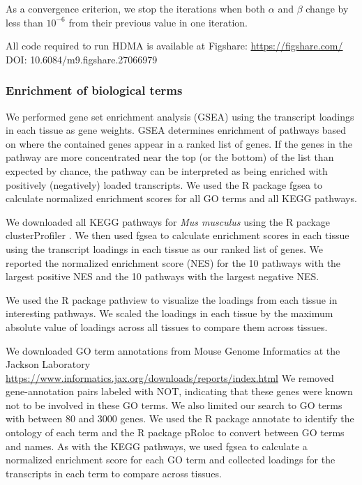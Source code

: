 \documentclass[
]{article}
\begin{document}
As a convergence criterion, we stop the iterations when both \(\alpha\)
and \(\beta\) change by less than \(10^{-6}\) from their previous value
in one iteration.

All code required to run HDMA is available at Figshare:
\url{https://figshare.com/} DOI: 10.6084/m9.figshare.27066979
\cite{DO_data}

\subsubsection{Enrichment of biological
terms}\label{enrichment-of-biological-terms}

We performed gene set enrichment analysis (GSEA) \cite{pmid16199517}
using the transcript loadings in each tissue as gene weights. GSEA
determines enrichment of pathways based on where the contained genes
appear in a ranked list of genes. If the genes in the pathway are more
concentrated near the top (or the bottom) of the list than expected by
chance, the pathway can be interpreted as being enriched with positively
(negatively) loaded transcripts. We used the R package fgsea
\cite{fgsea} to calculate normalized enrichment scores for all GO terms
and all KEGG pathways.

We downloaded all KEGG \cite{pmid36300620} pathways for
\textit{Mus musculus} using the R package clusterProfiler
\cite{pmid36300620}. We then used fgsea to calculate enrichment scores
in each tissue using the transcript loadings in each tissue as our
ranked list of genes. We reported the normalized enrichment score (NES)
for the 10 pathways with the largest positive NES and the 10 pathways
with the largest negative NES.

We used the R package pathview \cite{pmid23740750} to visualize the
loadings from each tissue in interesting pathways. We scaled the
loadings in each tissue by the maximum absolute value of loadings across
all tissues to compare them across tissues.

We downloaded GO term annotations from Mouse Genome Informatics at the
Jackson Laboratory \cite{pmid33231642}
\url{https://www.informatics.jax.org/downloads/reports/index.html} We
removed gene-annotation pairs labeled with NOT, indicating that these
genes were known not to be involved in these GO terms. We also limited
our search to GO terms with between 80 and 3000 genes. We used the R
package annotate \cite{R_annotate} to identify the ontology of each term
and the R package pRoloc \cite{pmid24413670} to convert between GO terms
and names. As with the KEGG pathways, we used fgsea to calculate a
normalized enrichment score for each GO term and collected loadings for
the transcripts in each term to compare across tissues.
\end{document}
